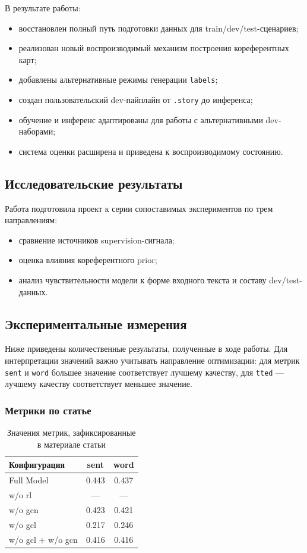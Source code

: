 \documentclass[12pt,a4paper]{article}
\begin{document}
В результате работы:

\begin{itemize}
    \item восстановлен полный путь подготовки данных для train/dev/test-сценариев;
    \item реализован новый воспроизводимый механизм построения кореферентных карт;
    \item добавлены альтернативные режимы генерации \texttt{labels};
    \item создан пользовательский dev-пайплайн от \texttt{.story} до инференса;
    \item обучение и инференс адаптированы для работы с альтернативными dev-наборами;
    \item система оценки расширена и приведена к воспроизводимому состоянию.
\end{itemize}

\subsection{Исследовательские результаты}

Работа подготовила проект к серии сопоставимых экспериментов по трем направлениям:

\begin{itemize}
    \item сравнение источников supervision-сигнала;
    \item оценка влияния кореферентного prior;
    \item анализ чувствительности модели к форме входного текста и составу dev/test-данных.
\end{itemize}

\subsection{Экспериментальные измерения}

Ниже приведены количественные результаты, полученные в ходе работы. Для интерпретации значений важно учитывать направление оптимизации: для метрик \texttt{sent} и \texttt{word} большее значение соответствует лучшему качеству, для \texttt{tted} --- лучшему качеству соответствует меньшее значение.

\subsubsection{Метрики по статье}

\begin{table}[H]
\centering
\caption{Значения метрик, зафиксированные в материале статьи}
\begin{tabular}{lcc}
\toprule
Конфигурация & sent & word \\
\midrule
Full Model & 0.443 & 0.437 \\
w/o rl & --- & --- \\
w/o gcn & 0.423 & 0.421 \\
w/o gcl & 0.217 & 0.246 \\
w/o gcl + w/o gcn & 0.416 & 0.416 \\
\bottomrule
\end{tabular}
\end{table}
\end{document}
